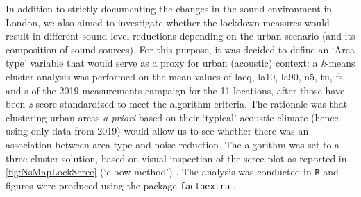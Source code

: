 In addition to strictly documenting the changes in the sound environment in London, we also aimed to investigate whether the lockdown measures would result in different sound level reductions depending on the urban scenario (and its composition of sound sources). For this purpose, it was decided to define an `Area type' variable that would serve as a proxy for urban (acoustic) context: a \emph{k}-means cluster analysis was performed on the mean values of \gls{laeq}, \gls{la10}, \gls{la90}, \gls{n5}, \gls{tu}, \gls{fs}, and \gls{s} of the 2019 measurements campaign for the 11 locations, after those have been \emph{z}-score standardized to meet the algorithm criteria. The rationale was that clustering urban areas \emph{a priori} based on their `typical' acoustic climate (hence using only data from 2019) would allow us to see whether there was an association between area type and noise reduction. The algorithm was set to a three-cluster solution, based on visual inspection of the scree plot as reported in \cref{fig:NsMapLockScree} (`elbow method') \citep{KetchenJr.1996application}. The analysis was conducted in \texttt{R} \citep{RCT2018R} and figures were produced using the package \texttt{factoextra} \citep{Kassambara2020factoextra}.

